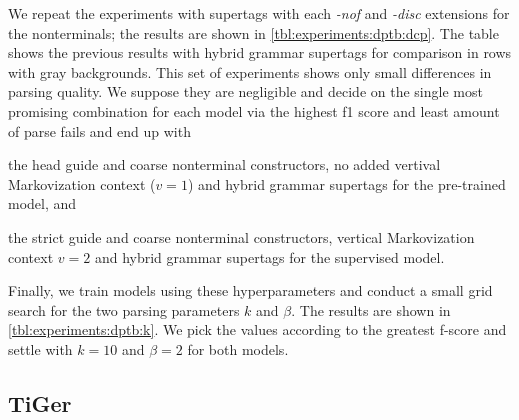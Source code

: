 \documentclass[../../document.tex]{subfiles}
\begin{document}
    We repeat the experiments with  supertags with each \emph{-nof} and \emph{-disc} extensions for the nonterminals; the results are shown in \cref{tbl:experiments:dptb:dcp}.
    The table shows the previous results with hybrid grammar supertags for comparison in rows with gray backgrounds.
    This set of experiments shows only small differences in parsing quality.
    We suppose they are negligible and decide on the single most promising combination for each model via the highest f1 score and least amount of parse fails and end up with
    \begin{compactitem}
        \item the head guide and coarse nonterminal constructors, no added vertival Markovization context ($v=1$) and hybrid grammar supertags for the pre-trained model, and
        \item the strict guide and coarse nonterminal constructors, vertical Markovization context \(v=2\) and hybrid grammar supertags for the supervised model.
    \end{compactitem}
    Finally, we train models using these hyperparameters and conduct a small grid search for the two parsing parameters \(k\) and \(\beta\). The results are shown in \cref{tbl:experiments:dptb:k}.
    We pick the values according to the greatest f-score and settle with \(k=10\) and \(\beta=2\) for both models.

    \subsection{TiGer}
    
\end{document}
